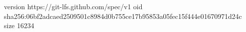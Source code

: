 version https://git-lfs.github.com/spec/v1
oid sha256:06bf2adcaed2509501c8984d0b755ce17b95853a05fec15f444e01670971d24c
size 16234
